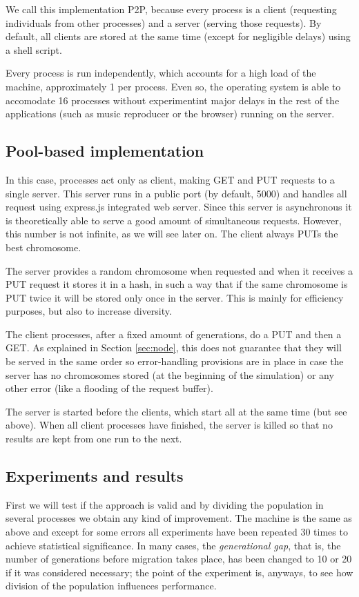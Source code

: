 \documentclass{sig-alternate}
\begin{document}
We call this implementation P2P, because every process is a client
(requesting individuals from other processes) and a server (serving
those requests). By default, all clients are stored at the same time
(except for negligible delays) using a shell script. 

Every process is run independently, which accounts for a high load of
the machine, approximately 1 per process. Even so, the operating
system is able to accomodate 16 processes without experimentint major
delays in the rest of the applications (such as music reproducer or
the browser) running on the server. 

\subsection{Pool-based implementation}

In this case, processes act only as client, making GET and PUT
requests to a single server. This server runs in a public port (by
default, 5000) and handles all request using express.js integrated web
server. Since this server is asynchronous it is theoretically able to
serve a good amount of simultaneous requests. However, this number is
not infinite, as we will see later on. The client always PUTs the best
chromosome. 

The server provides a random chromosome when requested and when it
receives a PUT request it stores it in a hash, in such a way that if
the same chromosome is PUT twice it will be stored only once in the
server. This is mainly for efficiency purposes, but also to increase
diversity. 

The client processes, after a fixed amount of generations, do a PUT
and then a GET. As explained in Section \ref{sec:node}, this does not
guarantee that they will be served in the same order so error-handling
provisions are in place in case the server has no chromosomes stored
(at the beginning of the simulation) or any other error (like a
flooding of the request buffer).

The server is started before the clients, which start all at the same
time (but see above). When all client processes have finished, the
server is killed so that no results are kept from one run to the next.

\subsection{Experiments and results}

First we will test if the approach is valid and by dividing the
population in several processes we obtain any kind of improvement. The
machine is the same as above and except for some errors all
experiments have been repeated 30 times to achieve statistical
significance. In many cases, the {\em generational gap}, that is, the
number of generations before migration takes place, has been changed
to 10 or 20 if it was considered necessary; the point of the
experiment is, anyways, to see how division of the population
influences performance. 
\end{document}
